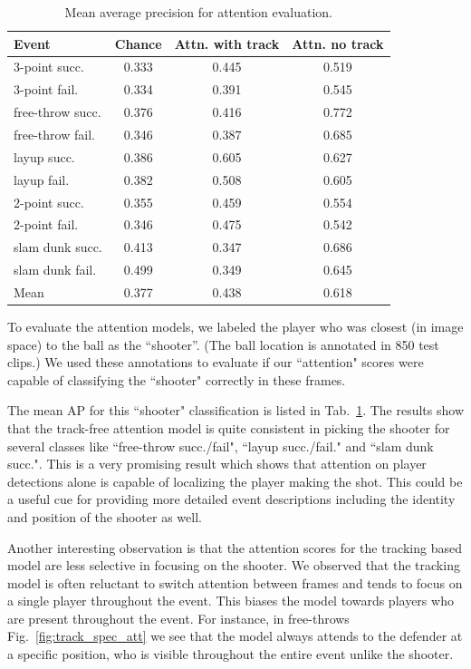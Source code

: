 \begin{table}[ht!]
\begin{center}
\small
 \begin{tabular}{|l|c|c|c|}
  \hline
Event            & Chance & Attn. with track & Attn. no track \\ \hline \hline
3-point succ.    & 0.333 & 0.445 & 0.519 \\ 
3-point fail.    & 0.334 & 0.391 & 0.545 \\ 
free-throw succ. & 0.376 & 0.416 & 0.772 \\ 
free-throw fail. & 0.346 & 0.387 & 0.685 \\  
layup succ.      & 0.386 & 0.605 & 0.627 \\ 
layup fail.      & 0.382 & 0.508 & 0.605 \\ 
2-point succ.    & 0.355 & 0.459 & 0.554 \\ 
2-point fail.    & 0.346 & 0.475 & 0.542 \\ 
slam dunk succ.  & 0.413 & 0.347 & 0.686 \\ 
slam dunk fail.  & 0.499 & 0.349 & 0.645 \\ \hline \hline  
Mean             & 0.377 & 0.438 & 0.618 \\ \hline
  \end{tabular}
\end{center}
  \caption{Mean average precision for attention evaluation.}
  \label{tab:attention_res}
\end{table}

To evaluate the attention models, we  labeled the player who was
closest (in image space) to the ball as the ``shooter''.
(The ball location is annotated in 850 test clips.)
We used these annotations to evaluate if our ``attention" scores
were capable of classifying the ``shooter" correctly in these frames.

The mean AP for this ``shooter"  classification is listed
in Tab.~\ref{tab:attention_res}.
The results show that the track-free attention model is quite consistent in picking
the shooter for several classes like ``free-throw succ./fail",
``layup succ./fail." and ``slam dunk succ.". This is a very
promising result which shows that attention on player detections
alone is capable of localizing the player making the shot. This could be
a useful cue for providing more detailed event descriptions
including the identity and position of the shooter as well.

Another interesting observation
is that the
attention scores for the tracking based model are less selective in focusing on
the shooter.  We observed that the tracking model is often reluctant to switch
attention between frames and tends to focus on a single player throughout the
event. This biases the model towards players who are present throughout the
event. For instance, in free-throws Fig.~\ref{fig:track_spec_att} we see that
the model always attends to the defender at a specific position, who is visible
throughout the entire event unlike the shooter.

